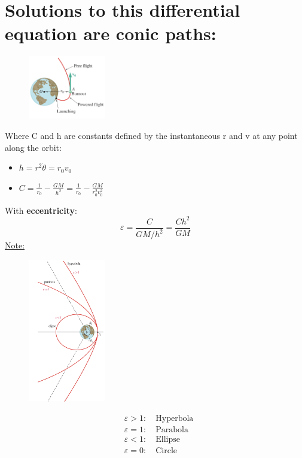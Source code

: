 \documentclass[10pt, fleqn]{article}
\begin{document}
\section*{Solutions to this differential equation are conic paths:} 
\begin{figure}[H]
    \centering
    \includegraphics[width=0.3\textwidth]{orbital.png}
\end{figure}
\begin{center}
\end{center}
Where C and h are constants defined by the instantaneous r and v at any point along the orbit:
\begin{itemize}
    \item $h =  r^2\dot{\theta} = r_0v_0$ 
    \item $C = \frac{1}{r_0} - \frac{GM}{h^2} = \frac{1}{r_0} - \frac{GM}{r_0^2v_0^2}$
\end{itemize}
\newpage \noindent
With \textbf{eccentricity}:
\[\varepsilon = \frac{C}{GM/h^2} = \frac{Ch^2}{GM}\]
\underline{Note:} 
\begin{multicols}{2}
\begin{figure}[H]
    \centering
    \includegraphics[width=0.3\textwidth]{eccentricity.png}
\end{figure}
\begin{align*}
&\varepsilon > 1: \quad \text{Hyperbola} \\
&\varepsilon = 1: \quad \text{Parabola} \\
&\varepsilon < 1: \quad \text{Ellipse} \\
&\varepsilon = 0: \quad \text{Circle}
\end{align*}
\end{multicols}
\end{document}
